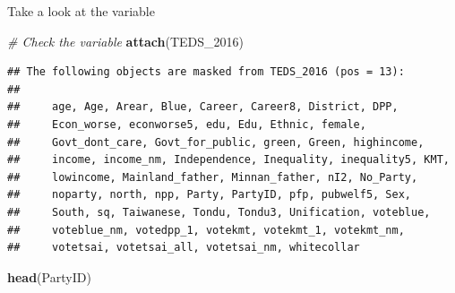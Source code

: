 \documentclass[]{book}
\newenvironment{Shaded}{\begin{snugshade}}{\end{snugshade}}
\newcommand{\CommentTok}[1]{\textcolor[rgb]{0.56,0.35,0.01}{\textit{#1}}}
\newcommand{\DataTypeTok}[1]{\textcolor[rgb]{0.13,0.29,0.53}{#1}}
\newcommand{\DecValTok}[1]{\textcolor[rgb]{0.00,0.00,0.81}{#1}}
\newcommand{\KeywordTok}[1]{\textcolor[rgb]{0.13,0.29,0.53}{\textbf{#1}}}
\newcommand{\NormalTok}[1]{#1}
\newcommand{\OperatorTok}[1]{\textcolor[rgb]{0.81,0.36,0.00}{\textbf{#1}}}
\newcommand{\StringTok}[1]{\textcolor[rgb]{0.31,0.60,0.02}{#1}}
\begin{document}
\begin{Shaded}
\end{Shaded}

Take a look at the variable

\begin{Shaded}
\begin{Highlighting}[]
\CommentTok{# Check the variable}
\KeywordTok{attach}\NormalTok{(TEDS_}\DecValTok{2016}\NormalTok{)}
\end{Highlighting}
\end{Shaded}

\begin{verbatim}
## The following objects are masked from TEDS_2016 (pos = 13):
## 
##     age, Age, Arear, Blue, Career, Career8, District, DPP,
##     Econ_worse, econworse5, edu, Edu, Ethnic, female,
##     Govt_dont_care, Govt_for_public, green, Green, highincome,
##     income, income_nm, Independence, Inequality, inequality5, KMT,
##     lowincome, Mainland_father, Minnan_father, nI2, No_Party,
##     noparty, north, npp, Party, PartyID, pfp, pubwelf5, Sex,
##     South, sq, Taiwanese, Tondu, Tondu3, Unification, voteblue,
##     voteblue_nm, votedpp_1, votekmt, votekmt_1, votekmt_nm,
##     votetsai, votetsai_all, votetsai_nm, whitecollar
\end{verbatim}

\begin{Shaded}
\begin{Highlighting}[]
\KeywordTok{head}\NormalTok{(PartyID)}
\end{Highlighting}
\end{Shaded}
\end{document}
